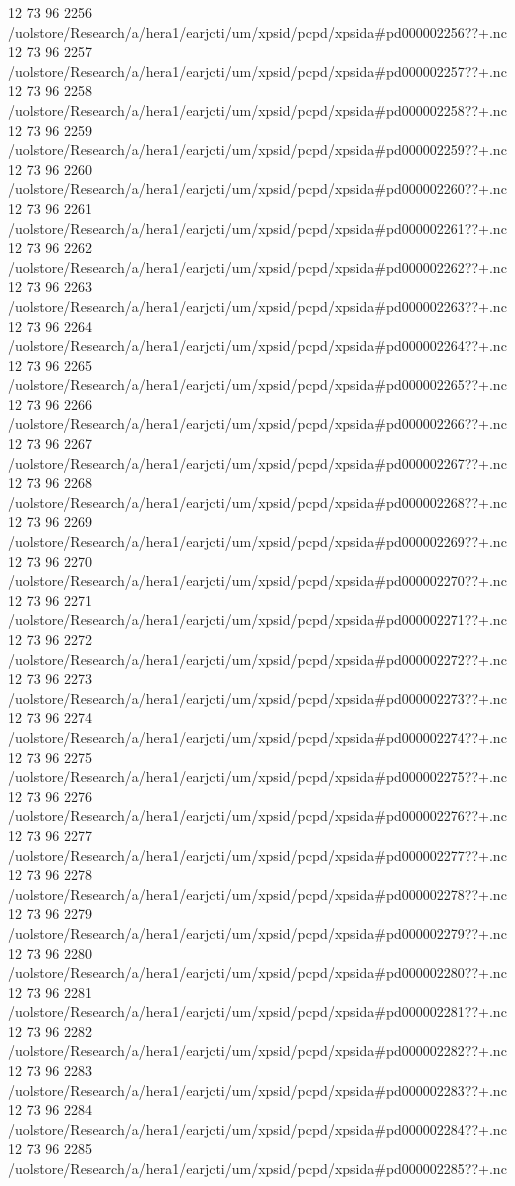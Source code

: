 12 73 96
2256
/uolstore/Research/a/hera1/earjcti/um/xpsid/pcpd/xpsida#pd000002256??+.nc
12 73 96
2257
/uolstore/Research/a/hera1/earjcti/um/xpsid/pcpd/xpsida#pd000002257??+.nc
12 73 96
2258
/uolstore/Research/a/hera1/earjcti/um/xpsid/pcpd/xpsida#pd000002258??+.nc
12 73 96
2259
/uolstore/Research/a/hera1/earjcti/um/xpsid/pcpd/xpsida#pd000002259??+.nc
12 73 96
2260
/uolstore/Research/a/hera1/earjcti/um/xpsid/pcpd/xpsida#pd000002260??+.nc
12 73 96
2261
/uolstore/Research/a/hera1/earjcti/um/xpsid/pcpd/xpsida#pd000002261??+.nc
12 73 96
2262
/uolstore/Research/a/hera1/earjcti/um/xpsid/pcpd/xpsida#pd000002262??+.nc
12 73 96
2263
/uolstore/Research/a/hera1/earjcti/um/xpsid/pcpd/xpsida#pd000002263??+.nc
12 73 96
2264
/uolstore/Research/a/hera1/earjcti/um/xpsid/pcpd/xpsida#pd000002264??+.nc
12 73 96
2265
/uolstore/Research/a/hera1/earjcti/um/xpsid/pcpd/xpsida#pd000002265??+.nc
12 73 96
2266
/uolstore/Research/a/hera1/earjcti/um/xpsid/pcpd/xpsida#pd000002266??+.nc
12 73 96
2267
/uolstore/Research/a/hera1/earjcti/um/xpsid/pcpd/xpsida#pd000002267??+.nc
12 73 96
2268
/uolstore/Research/a/hera1/earjcti/um/xpsid/pcpd/xpsida#pd000002268??+.nc
12 73 96
2269
/uolstore/Research/a/hera1/earjcti/um/xpsid/pcpd/xpsida#pd000002269??+.nc
12 73 96
2270
/uolstore/Research/a/hera1/earjcti/um/xpsid/pcpd/xpsida#pd000002270??+.nc
12 73 96
2271
/uolstore/Research/a/hera1/earjcti/um/xpsid/pcpd/xpsida#pd000002271??+.nc
12 73 96
2272
/uolstore/Research/a/hera1/earjcti/um/xpsid/pcpd/xpsida#pd000002272??+.nc
12 73 96
2273
/uolstore/Research/a/hera1/earjcti/um/xpsid/pcpd/xpsida#pd000002273??+.nc
12 73 96
2274
/uolstore/Research/a/hera1/earjcti/um/xpsid/pcpd/xpsida#pd000002274??+.nc
12 73 96
2275
/uolstore/Research/a/hera1/earjcti/um/xpsid/pcpd/xpsida#pd000002275??+.nc
12 73 96
2276
/uolstore/Research/a/hera1/earjcti/um/xpsid/pcpd/xpsida#pd000002276??+.nc
12 73 96
2277
/uolstore/Research/a/hera1/earjcti/um/xpsid/pcpd/xpsida#pd000002277??+.nc
12 73 96
2278
/uolstore/Research/a/hera1/earjcti/um/xpsid/pcpd/xpsida#pd000002278??+.nc
12 73 96
2279
/uolstore/Research/a/hera1/earjcti/um/xpsid/pcpd/xpsida#pd000002279??+.nc
12 73 96
2280
/uolstore/Research/a/hera1/earjcti/um/xpsid/pcpd/xpsida#pd000002280??+.nc
12 73 96
2281
/uolstore/Research/a/hera1/earjcti/um/xpsid/pcpd/xpsida#pd000002281??+.nc
12 73 96
2282
/uolstore/Research/a/hera1/earjcti/um/xpsid/pcpd/xpsida#pd000002282??+.nc
12 73 96
2283
/uolstore/Research/a/hera1/earjcti/um/xpsid/pcpd/xpsida#pd000002283??+.nc
12 73 96
2284
/uolstore/Research/a/hera1/earjcti/um/xpsid/pcpd/xpsida#pd000002284??+.nc
12 73 96
2285
/uolstore/Research/a/hera1/earjcti/um/xpsid/pcpd/xpsida#pd000002285??+.nc
